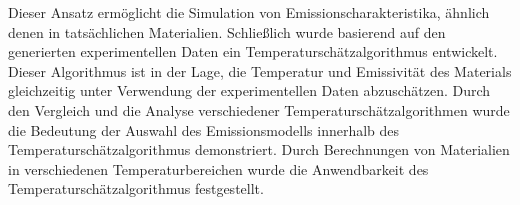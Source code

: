 {	Dieser Ansatz ermöglicht die Simulation von Emissionscharakteristika, ähnlich denen in 
	tatsächlichen Materialien. Schließlich wurde basierend auf den generierten experimentellen 
	Daten ein Temperaturschätzalgorithmus entwickelt. Dieser Algorithmus ist in der Lage, 
	die Temperatur und Emissivität des Materials gleichzeitig unter Verwendung der 
	experimentellen Daten abzuschätzen. Durch den Vergleich und die Analyse 
	verschiedener Temperaturschätzalgorithmen wurde die Bedeutung der Auswahl 
	des Emissionsmodells innerhalb des Temperaturschätzalgorithmus demonstriert. 
	Durch Berechnungen von Materialien in verschiedenen Temperaturbereichen wurde die 
	Anwendbarkeit des Temperaturschätzalgorithmus festgestellt.%
	\thispagestyle{empty}
}%
%
%